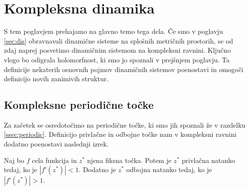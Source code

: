 \section{Kompleksna dinamika} \label{sec:komdin}

S tem poglavjem prehajamo na glavno temo tega dela. Če smo v poglavju \ref{sec:dis} obravnavali dinamične sisteme na splošnih metričnih prostorih, se od zdaj naprej posvetimo dinamičnim sistemom na kompleksni ravnini. Ključno vlogo bo odigrala holomorfnost, ki smo jo spoznali v prejšnjem poglavju. Ta definicije nekaterih osnovnih pojmov dinamičnih sistemov poenostavi in omogoči definicijo novih zanimivih struktur.

\subsection{Kompleksne periodične točke}

\noindent Za začetek se osredotočimo na periodične točke, ki smo jih spoznali že v razdelku \ref{ssec:periodic}. Definicijo privlačne in odbojne točke nam v kompleksni ravnini dodatno poenostavi naslednji izrek.

\begin{izrek}
    Naj bo \(f\) cela funkcija in \(z^*\) njena fiksna točka. Potem je \(z^*\) privlačna natanko tedaj, ko je \(|f' (z^*)| < 1\). Dodatno je \(z^*\) odbojna natanko tedaj, ko je \(|f' (z^*)| > 1\).
\end{izrek}


